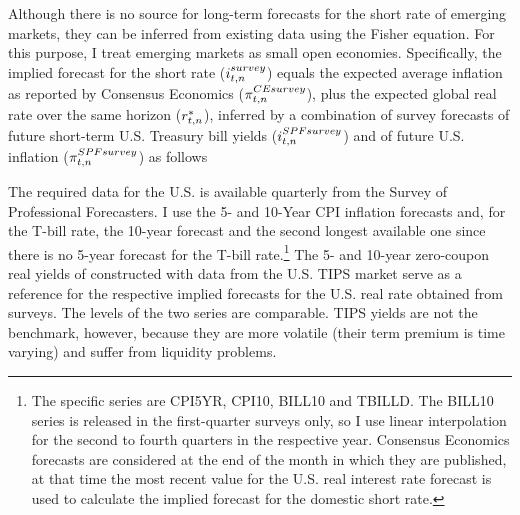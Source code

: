 {Although there is no source for long-term forecasts for the short rate of emerging markets, they can be inferred from existing data using the Fisher equation. 
For this purpose, I treat emerging markets as small open economies. 
Specifically, the implied forecast for the short rate (\(i_{t,n}^{survey}\)) equals the expected average inflation %
as reported by Consensus Economics (\(\pi^{CE survey}_{t,n}\)), plus the expected global real rate over the same horizon (\(r_{t,n}^{*}\)), inferred by a combination of survey forecasts of future short-term U.S. Treasury bill yields (\(i^{SPF survey}_{t,n}\)) and of future U.S. inflation (\(\pi^{SPF survey}_{t,n}\)) as follows

The required data for the U.S. is available quarterly from the Survey of Professional Forecasters.
I use the 5- and 10-Year CPI inflation forecasts and, for the T-bill rate, the 10-year forecast and the second longest available one
since there is no 5-year forecast for the T-bill rate.\footnote{ The specific series are CPI5YR, CPI10, BILL10 and TBILLD. The BILL10 series is released in the first-quarter surveys only, so I use linear interpolation for the second to fourth quarters in the respective year. Consensus Economics forecasts are considered at the end of the month in which they are published, at that time the most recent value for the U.S. real interest rate forecast is used to calculate the implied forecast for the domestic short rate.}
The 5- and 10-year zero-coupon real yields of \cite{GSW:2010} constructed with data from the U.S. TIPS market serve as a reference for the respective implied forecasts for the U.S. real rate obtained from surveys.
The levels of the two series are comparable. 
TIPS yields are not the benchmark, however, because they are more volatile (their term premium is time varying) and suffer from liquidity problems.


}
